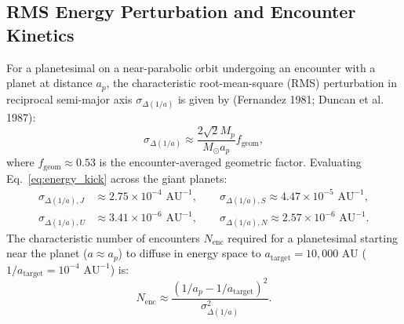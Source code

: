\documentclass[11pt,a4paper]{article}
\begin{document}
\subsection{RMS Energy Perturbation and Encounter Kinetics}
For a planetesimal on a near-parabolic orbit undergoing an encounter with a planet at distance $a_p$, the characteristic root-mean-square (RMS) perturbation in reciprocal semi-major axis $\sigma_{\Delta(1/a)}$ is given by (Fernandez 1981; Duncan et al. 1987):
\begin{equation}
\sigma_{\Delta(1/a)} \approx \frac{2 \sqrt{2} M_p}{M_\odot a_p} f_{\text{geom}},
\label{eq:energy_kick}
\end{equation}
where $f_{\text{geom}} \approx 0.53$ is the encounter-averaged geometric factor. Evaluating Eq.~\eqref{eq:energy_kick} across the giant planets:
\begin{align}
\sigma_{\Delta(1/a), J} &\approx 2.75 \times 10^{-4}\text{ AU}^{-1}, \qquad \sigma_{\Delta(1/a), S} \approx 4.47 \times 10^{-5}\text{ AU}^{-1}, \\
\sigma_{\Delta(1/a), U} &\approx 3.41 \times 10^{-6}\text{ AU}^{-1}, \qquad \sigma_{\Delta(1/a), N} \approx 2.57 \times 10^{-6}\text{ AU}^{-1}.
\end{align}
The characteristic number of encounters $N_{\text{enc}}$ required for a planetesimal starting near the planet ($a \approx a_p$) to diffuse in energy space to $a_{\text{target}} = 10,000\text{ AU}$ ($1/a_{\text{target}} = 10^{-4}\text{ AU}^{-1}$) is:
\begin{equation}
N_{\text{enc}} \approx \frac{(1/a_p - 1/a_{\text{target}})^2}{\sigma_{\Delta(1/a)}^2}.
\end{equation}
\end{document}

